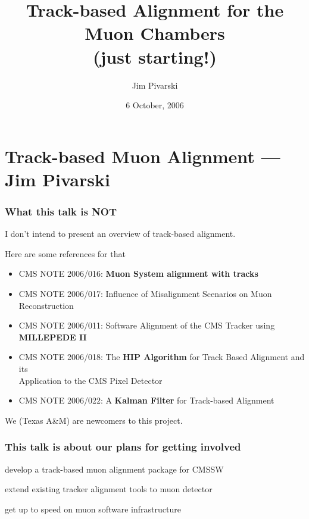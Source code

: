 \documentclass[12pt,compress]{beamer}
\title{Track-based Alignment for the \\ Muon Chambers \\ (just starting!)}
\author{Jim Pivarski}
\institute{Texas A\&M University}
\date{6 October, 2006}
\begin{document}
\frame{\titlepage}
\section*{Track-based Muon Alignment --- Jim Pivarski}

\begin{frame}
\frametitle{What this talk is NOT}

I don't intend to present an overview of track-based alignment.

\vfill
Here are some references for that

\vspace{0.5 cm}
\begin{minipage}{\linewidth}
\scriptsize
\begin{itemize}
  \item CMS NOTE 2006/016: {\bf Muon System alignment with tracks}
  \item CMS NOTE 2006/017: Influence of Misalignment Scenarios on Muon \\ \hspace{3.5 cm} Reconstruction
\end{itemize}

\begin{itemize}
  \item CMS NOTE 2006/011: Software Alignment of the CMS Tracker using \\ \hspace{3.5 cm} {\bf MILLEPEDE II}
  \item CMS NOTE 2006/018: The {\bf HIP Algorithm} for Track Based Alignment and its \\ \hspace{3.5 cm} Application to the CMS Pixel Detector
  \item CMS NOTE 2006/022: A {\bf Kalman Filter} for Track-based Alignment
\end{itemize}
\end{minipage}

\vfill
We (Texas A\&M) are newcomers to this project.
\end{frame}

\begin{frame}
\frametitle{This talk is about our plans for getting involved}
\begin{description}\setlength{\itemsep}{1 cm}
  \item[Objective:] develop a track-based muon alignment package for CMSSW
  \item[Method:] extend existing tracker alignment tools to muon detector
  \item[Short-term (this talk):] get up to speed on muon software infrastructure
\end{description}
\end{frame}
\end{document}
